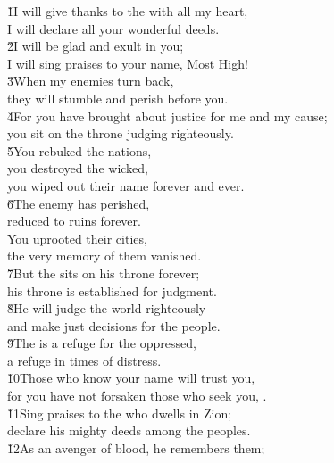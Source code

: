 \begin{poetry}
\poeml \v{1}I will give thanks to the  with all my heart, \\
\poemll    I will declare all your wonderful deeds. \\
\poeml \v{2}I will be glad and exult in you; \\
\poemll    I will sing praises to your name, Most High! \\
\poeml \v{3}When my enemies turn back, \\
\poemll    they will stumble and perish before you. \\
\poeml \v{4}For you have brought about justice for me and my cause; \\
\poemll    you sit on the throne judging righteously. \\
\poeml \v{5}You rebuked the nations, \\
\poemll    you destroyed the wicked, \\
\poemlll       you wiped out their name forever and ever. \\
\poeml \v{6}The enemy has perished, \\
\poemll    reduced to ruins forever. \\
\poeml You uprooted their cities, \\
\poemll    the very memory of them vanished. \\
\poeml \v{7}But the  sits on his throne forever; \\
\poemll    his throne is established for judgment. \\
\poeml \v{8}He will judge the world righteously \\
\poemll    and make just decisions for the people. \\
\poeml \v{9}The  is a refuge for the oppressed, \\
\poemll    a refuge in times of distress. \\
\poeml \v{10}Those who know your name will trust you, \\
\poemll    for you have not forsaken those who seek you, . \\
\poeml \v{11}Sing praises to the  who dwells in Zion; \\
\poemll    declare his mighty deeds among the peoples. \\
\poeml \v{12}As an avenger of blood, he remembers them; \\

\end{poetry}
